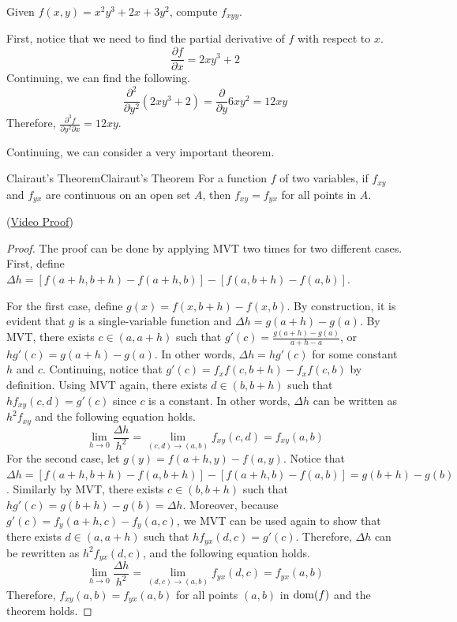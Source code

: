 \documentclass[../../../main.tex]{subfiles}
\begin{document}
\begin{problem}{}{}
Given $f(x, y) = x^2y^3 + 2x + 3y^2$, compute $f_{xyy}$.
\end{problem}
\begin{solution}
First, notice that we need to find the partial derivative of $f$
with respect to $x$.
\[
\frac{\partial f}{\partial x}
= 2xy^3 + 2
\]
Continuing, we can find the following.
\[
\frac{\partial^2}{\partial y^2} (2xy^3 + 2)
= \frac{\partial}{\partial y} 6xy^2
= 12xy
\]
Therefore, $\frac{\partial^3 f}{\partial y^2 \partial x} = 12xy$.
\end{solution}

Continuing, we can consider a very important theorem.

\begin{theorem}{Clairaut's Theorem}{Clairaut's Theorem}
For a function $f$ of two variables, if $f_{xy}$ and $f_{yx}$ are
continuous on an open set $A$, then $f_{xy} = f_{yx}$ for all points
in $A$.
\end{theorem}
(\href{https://youtu.be/7vO3xPjTP_4}{Video Proof})
\begin{proof}
The proof can be done by applying MVT two times for two different
cases. First, define $\Delta h = [f(a + h, b + h) - f(a + h, b)]
- [f(a, b + h) - f(a, b)]$.

For the first case, define $g(x) = f(x, b + h) - f(x, b)$.
By construction, it is evident that $g$ is a single-variable function
and $\Delta h = g(a + h) - g(a)$. By MVT, there exists $c \in
(a, a + h)$ such that $g'(c) = \frac{g(a + h) - g(a)}{a + h - a}$,
or $h g'(c) = g(a + h) - g(a)$. In other words, $\Delta h = hg'(c)$
for some constant $h$ and $c$. Continuing, notice that $g'(c)
= f_x f(c, b + h) - f_x f(c, b)$ by definition. Using MVT again,
there exists $d \in (b, b + h)$ such that $h f_{xy} (c, d) = g'(c)$
since $c$ is a constant. In other words, $\Delta h$ can be written
as $h^2 f_{xy}$ and the following equation holds.
\[
\lim_{h \to 0} \frac{\Delta h}{h^2}
= \lim_{(c, d) \to (a, b)} f_{xy} (c, d)
= f_{xy} (a, b)
\]
For the second case, let $g(y) = f(a + h, y) - f(a, y)$. Notice that
$\Delta h = [f(a + h, b + h) - f(a, b + h)] - [f(a + h, b) - f(a, b)]
= g(b + h) - g(b)$. Similarly by MVT, there exists $c \in (b, b + h)$
such that $h g'(c) = g(b + h) - g(b) = \Delta h$. Moreover, because
$g'(c) = f_y (a + h, c) - f_y (a, c)$, we MVT can be used again to
show that there exists $d \in (a, a + h)$ such that $h f_{yx} (d, c) =
g'(c)$. Therefore, $\Delta h$ can be rewritten as $h^2 f_{yx} (d, c)$,
and the following equation holds.
\[
\lim_{h \to 0} \frac{\Delta h}{h^2}
= \lim_{(d, c) \to (a, b)} f_{yx} (d, c)
= f_{yx} (a, b)
\]
Therefore, $f_{xy} (a, b) = f_{yx} (a, b)$ for all points $(a, b)$
in $\operatorname{dom}(f)$ and the theorem holds.
\end{proof}
\end{document}

